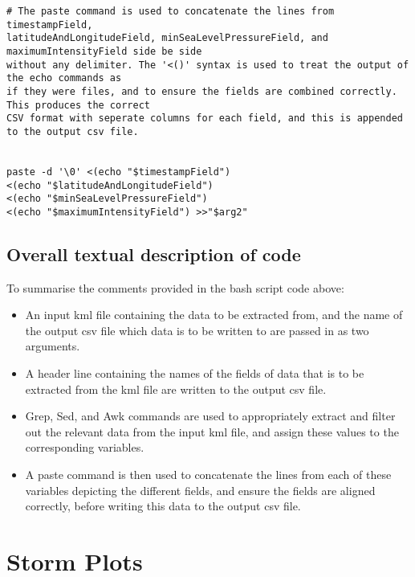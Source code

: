 \documentclass[]{article} %
\begin{document}
\begin{verbatim}
# The paste command is used to concatenate the lines from timestampField, 
latitudeAndLongitudeField, minSeaLevelPressureField, and maximumIntensityField side be side 
without any delimiter. The '<()' syntax is used to treat the output of the echo commands as 
if they were files, and to ensure the fields are combined correctly. This produces the correct 
CSV format with seperate columns for each field, and this is appended to the output csv file.


paste -d '\0' <(echo "$timestampField") 
<(echo "$latitudeAndLongitudeField") 
<(echo "$minSeaLevelPressureField") 
<(echo "$maximumIntensityField") >>"$arg2"
\end{verbatim}

\begin{figure}[htbp]
  \captionsetup{justification=centering}
\end{figure}
\newpage
\subsection{Overall textual description of code\\} %

To summarise the comments provided in the bash script code above:
\begin{itemize}
    \item An input kml file containing the data to be extracted from, and the name of the output csv file which data is to be written to are passed in as two arguments.
    \item A header line containing the names of the fields of data that is to be extracted from the kml file are written to the output csv file.
    \item Grep, Sed, and Awk commands are used to appropriately extract and filter out the relevant data from the input kml file, and assign these values to the corresponding variables.
    \item A paste command is then used to concatenate the lines from each of these variables depicting the different fields, and ensure the fields are aligned correctly, before writing this data to the output csv file.
\end{itemize}

\section{Storm Plots} %
\end{document}
